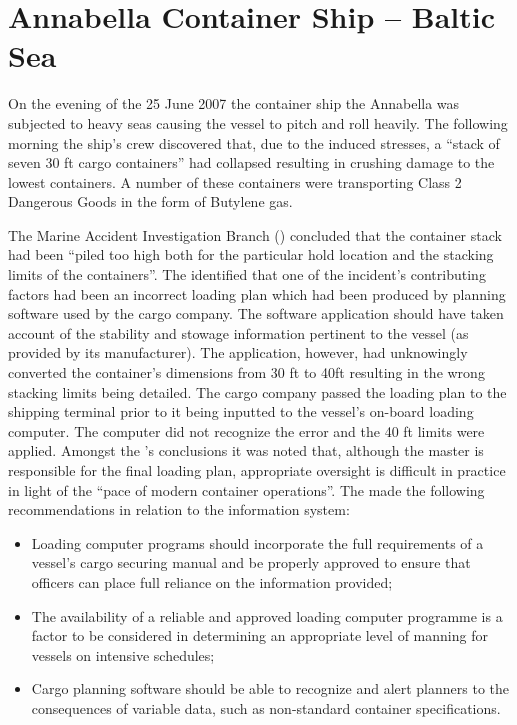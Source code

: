 \section{Annabella Container Ship -- Baltic Sea} \label{bkm:incacc:annabella}
On the evening of the 25 June 2007 the container ship the Annabella was subjected to heavy seas causing the vessel to pitch and roll heavily. The following morning the ship’s crew discovered that, due to the induced stresses, a ``stack of seven 30 ft cargo containers'' had collapsed resulting in crushing damage to the lowest containers. A number of these containers were transporting Class 2 Dangerous Goods in the form of Butylene gas.
 
The Marine Accident Investigation Branch () concluded that the container stack had been ``piled too high both for the particular hold location and the stacking limits of the containers''. The  identified that one of the incident’s contributing factors had been an incorrect loading plan which had been produced by planning software used by the cargo company. The software application should have taken account of the stability and stowage \gls{information} pertinent to the vessel (as provided by its manufacturer). The application, however, had unknowingly converted the container’s dimensions from 30 ft to 40ft resulting in the wrong stacking limits being detailed. The cargo company passed the loading plan to the shipping terminal prior to it being inputted to the vessel’s on-board loading computer. The computer did not recognize the error and the 40 ft limits were applied. Amongst the ’s conclusions it was noted that, although the master is responsible for the final loading plan, appropriate oversight is difficult in practice in light of the ``pace of modern container operations''. The  made the following recommendations in relation to the \gls{information} system:
\begin{itemize}
\item Loading computer programs should incorporate the full requirements of a vessel’s cargo securing manual and be properly approved to ensure that officers can place full reliance on the \gls{information} provided;
\item The \gls{availability} of a reliable and approved loading computer programme is a factor to be considered in determining an appropriate level of manning for vessels on intensive schedules; 
\item Cargo planning software should be able to recognize and alert planners to the consequences of variable data, such as non-standard container specifications.
\end{itemize}

